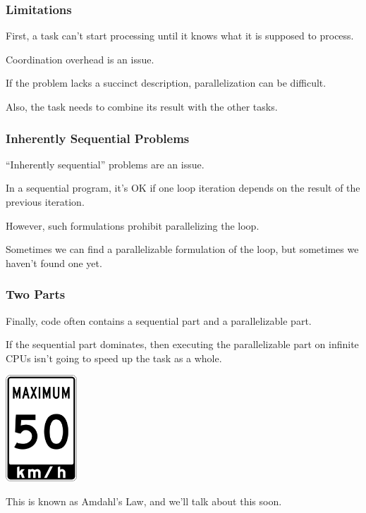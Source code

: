 \begin{frame}
\frametitle{Limitations}

First, a task can't start processing until it knows what it
is supposed to process. 

Coordination overhead is an issue. 

If the
problem lacks a succinct description, parallelization can be
difficult. 

Also, the task needs to combine its result with the other
tasks.

\end{frame}



\begin{frame}
\frametitle{Inherently Sequential Problems}

``Inherently sequential'' problems are an issue. 

In a sequential 
program, it's OK if one loop iteration depends on the result of the
previous iteration. 

However, such formulations prohibit parallelizing
the loop. 

Sometimes we can find a parallelizable formulation of the loop,
but sometimes we haven't found one yet.

\end{frame}




\begin{frame}
\frametitle{Two Parts}

Finally, code often contains a sequential part and a parallelizable
part.  

If the sequential part dominates, then
executing the parallelizable part on infinite CPUs isn't going to speed up the task as a whole. 

\begin{center}
	\includegraphics[width=0.2\textwidth]{images/speedlimit.png}
\end{center}

This is
known as Amdahl's Law, and we'll talk about this soon.


\end{frame}




